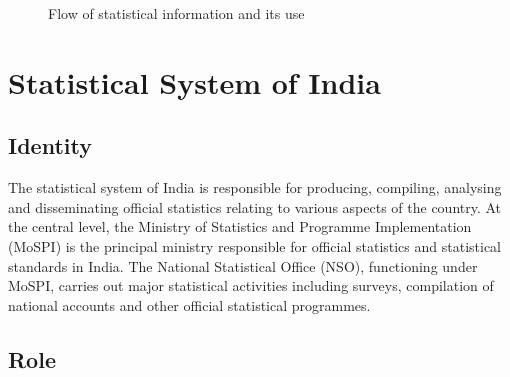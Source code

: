 \documentclass[12pt,a4paper]{article}
\begin{document}
\begin{figure}[H]
\centering


\caption{Flow of statistical information and its use}
\label{fig:statistical-flow}

\end{figure}

\section{Statistical System of India}

\subsection{Identity}

The statistical system of India is responsible for producing, compiling, analysing and disseminating official statistics relating to various aspects of the country. At the central level, the Ministry of Statistics and Programme Implementation (MoSPI) is the principal ministry responsible for official statistics and statistical standards in India. The National Statistical Office (NSO), functioning under MoSPI, carries out major statistical activities including surveys, compilation of national accounts and other official statistical programmes.

\subsection{Role}
\end{document}
